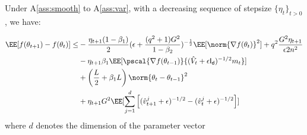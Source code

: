 \documentclass[11pt]{article}
\begin{document}
\begin{Lemma*}
Under A\ref{ass:smooth} to A\ref{ass:var}, with a decreasing sequence of stepsize $\{\eta_t\}_{t>0}$, we have:

\begin{equation}
\begin{split}
\EE[f(\theta_{t+1}) - f(\theta_{t}) ] \leq &   - \frac{\eta_{t+1}(1-\beta_1)}{2}  (\epsilon + \frac{(q^2+1)G^2}{1 - \beta_2})^{-\frac{1}{2}} \EE[\norm{\nabla f(\theta_t)}^2] +q^2 \frac{G^2 \eta_{t+1}}{\epsilon 2n^2} \\
&- \eta_{t+1} \beta_1\EE[\pscal{\nabla f(\theta_{t-1})}{(\hat{V}_{t} + \epsilon \mathsf{I_d})^{-1/2} m_{t}}]\\
& +  \left(\frac{L}{2} + \beta_1 L \right) \norm{\theta_t - \theta_{t-1}}^2\\
&+   \eta_{t+1} G^2 \EE[\sum_{j=1}^d \left[(\hat{v}^j_{t+1} + \epsilon )^{-1/2} - (\hat{v}^j_{t} + \epsilon )^{-1/2}  \right] ]
\end{split}
\end{equation}
where $d$ denotes the dimension of the parameter vector
\end{Lemma*}
\end{document}
